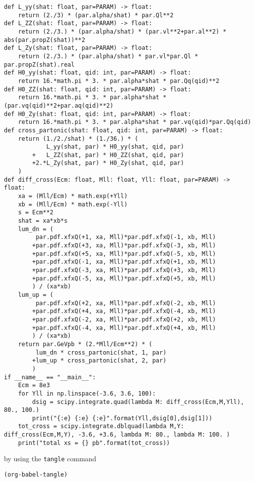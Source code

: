 \documentclass[11pt]{article}
\begin{document}
\begin{verbatim}
def L_yy(shat: float, par=PARAM) -> float:
    return (2./3) * (par.alpha/shat) * par.Ql**2
def L_ZZ(shat: float, par=PARAM) -> float:
    return (2./3.) * (par.alpha/shat) * (par.vl**2+par.al**2) * abs(par.propZ(shat))**2
def L_Zy(shat: float, par=PARAM) -> float:
    return (2./3.) * (par.alpha/shat) * par.vl*par.Ql * par.propZ(shat).real
def H0_yy(shat: float, qid: int, par=PARAM) -> float:
    return 16.*math.pi * 3. * par.alpha*shat * par.Qq(qid)**2
def H0_ZZ(shat: float, qid: int, par=PARAM) -> float:
    return 16.*math.pi * 3. * par.alpha*shat * (par.vq(qid)**2+par.aq(qid)**2)
def H0_Zy(shat: float, qid: int, par=PARAM) -> float:
    return 16.*math.pi * 3. * par.alpha*shat * par.vq(qid)*par.Qq(qid)
def cross_partonic(shat: float, qid: int, par=PARAM) -> float:
    return (1./2./shat) * (1./36.) * (
            L_yy(shat, par) * H0_yy(shat, qid, par)
        +   L_ZZ(shat, par) * H0_ZZ(shat, qid, par)
        +2.*L_Zy(shat, par) * H0_Zy(shat, qid, par)
    )
def diff_cross(Ecm: float, Mll: float, Yll: float, par=PARAM) -> float:
    xa = (Mll/Ecm) * math.exp(+Yll)
    xb = (Mll/Ecm) * math.exp(-Yll)
    s = Ecm**2
    shat = xa*xb*s
    lum_dn = (
         par.pdf.xfxQ(+1, xa, Mll)*par.pdf.xfxQ(-1, xb, Mll)
        +par.pdf.xfxQ(+3, xa, Mll)*par.pdf.xfxQ(-3, xb, Mll)
        +par.pdf.xfxQ(+5, xa, Mll)*par.pdf.xfxQ(-5, xb, Mll)
        +par.pdf.xfxQ(-1, xa, Mll)*par.pdf.xfxQ(+1, xb, Mll)
        +par.pdf.xfxQ(-3, xa, Mll)*par.pdf.xfxQ(+3, xb, Mll)
        +par.pdf.xfxQ(-5, xa, Mll)*par.pdf.xfxQ(+5, xb, Mll)
        ) / (xa*xb)
    lum_up = (
         par.pdf.xfxQ(+2, xa, Mll)*par.pdf.xfxQ(-2, xb, Mll)
        +par.pdf.xfxQ(+4, xa, Mll)*par.pdf.xfxQ(-4, xb, Mll)
        +par.pdf.xfxQ(-2, xa, Mll)*par.pdf.xfxQ(+2, xb, Mll)
        +par.pdf.xfxQ(-4, xa, Mll)*par.pdf.xfxQ(+4, xb, Mll)
        ) / (xa*xb)
    return par.GeVpb * (2.*Mll/Ecm**2) * (
         lum_dn * cross_partonic(shat, 1, par)
        +lum_up * cross_partonic(shat, 2, par)
        )
if __name__ == "__main__":
    Ecm = 8e3
    for Yll in np.linspace(-3.6, 3.6, 100):
        dsig = scipy.integrate.quad(lambda M: diff_cross(Ecm,M,Yll), 80., 100.)
        print("{:e} {:e} {:e}".format(Yll,dsig[0],dsig[1]))
    tot_cross = scipy.integrate.dblquad(lambda M,Y: diff_cross(Ecm,M,Y), -3.6, +3.6, lambda M: 80., lambda M: 100. )
    print("total xs = {} pb".format(tot_cross))
\end{verbatim}
by using the \texttt{tangle} command
\begin{verbatim}
(org-babel-tangle)
\end{verbatim}
\end{document}

